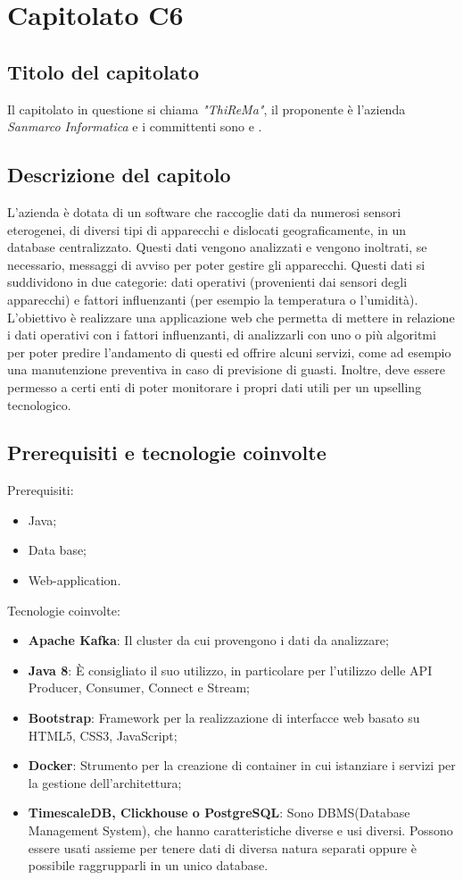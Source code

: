 \section{Capitolato C6}
\subsection{Titolo del capitolato}
Il capitolato in questione si chiama \textit{"ThiReMa"}, il proponente \`e l'azienda \textit{Sanmarco Informatica} e i committenti sono \VT{} e \CR{}.

\subsection{Descrizione del capitolo}
L'azienda \`e dotata di un software che raccoglie dati da numerosi sensori eterogenei, di diversi tipi di apparecchi e dislocati geograficamente, in un database centralizzato. Questi dati vengono analizzati e vengono inoltrati, se necessario, messaggi di avviso per poter gestire gli apparecchi. Questi dati si suddividono in due categorie: dati operativi (provenienti dai sensori degli apparecchi) e fattori influenzanti (per esempio la temperatura o l'umidit\`a).
L'obiettivo \`e realizzare una applicazione web che permetta di mettere in relazione i dati operativi con i fattori influenzanti, di analizzarli con uno o pi\`u algoritmi per poter predire l'andamento di questi ed offrire alcuni servizi, come ad esempio una manutenzione preventiva in caso di previsione di guasti. Inoltre, deve essere permesso a certi enti di poter monitorare i propri dati utili per un upselling tecnologico.


\subsection{Prerequisiti e tecnologie coinvolte}
Prerequisiti:
\begin{itemize}
\item Java;	
\item Data base;
\item Web-application.
\end{itemize}
Tecnologie coinvolte:
\begin{itemize}
\item \textbf{Apache Kafka}: Il cluster da cui provengono i dati da analizzare;
\item \textbf{Java 8}: È consigliato il suo utilizzo, in particolare per l'utilizzo delle API Producer, Consumer, Connect e Stream;
\item \textbf{Bootstrap}: Framework per la realizzazione di interfacce web basato su HTML5, CSS3, JavaScript;
\item \textbf{Docker}: Strumento per la creazione di container in cui istanziare i servizi per la gestione dell'architettura;
\item \textbf{TimescaleDB, Clickhouse o PostgreSQL}: Sono DBMS(Database Management System), che hanno caratteristiche diverse e usi diversi. Possono essere usati assieme per tenere dati di diversa natura separati oppure \`e possibile raggrupparli in un unico database.
\end{itemize}

